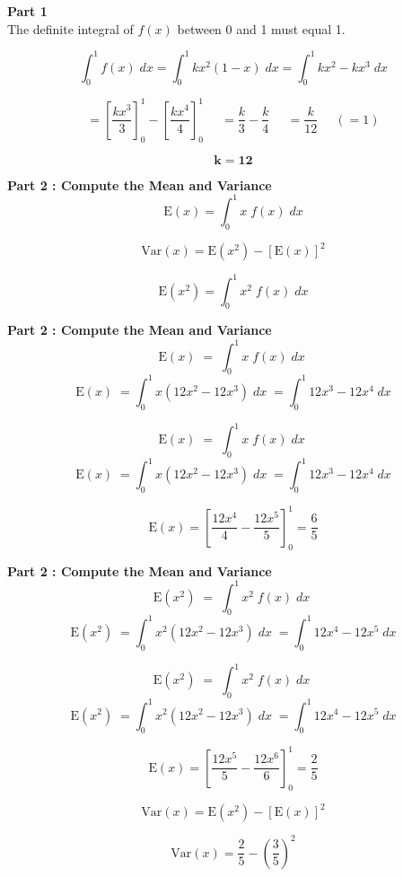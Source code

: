 			
			
			\textbf{Part 1}\\
			The definite integral of $f(x)$ between 0 and 1 must equal 1.
			
			\[ \int^1_0 f(x)\;dx = \int^1_0 kx^2(1-x)\;dx = \int^1_0 kx^2-kx^3\;dx  \]
			
			\[ = \left[\frac{kx^3}{3} \right]^1_0  - \left[\frac{kx^4}{4} \right]^1_0
			\phantom{sce} = \frac{k}{3} - \frac{k}{4} \phantom{sce} = \frac{k}{12} \phantom{sce}(= 1)
			\]
			
			\[ \boldsymbol{k = 12}\]
			
			\textbf{Part 2 :  Compute the Mean and Variance}\\
			\[ \mathrm{E}(x) = \int^1_0 x\; f(x)\;dx  \]
			
			\[ \mathrm{Var}(x) = \mathrm{E}(x^2)  - [\mathrm{E}(x)]^2   \]
			
			\[ \mathrm{E}(x^2) = \int^1_0 x^2\; f(x)\;dx \]
			
			\textbf{Part 2 :  Compute the Mean and Variance}\\
			\[ \mathrm{E}(x) \; = \; \int^1_0 x\; f(x)\;dx \;   \]
			\[ \mathrm{E}(x) \; = \int^1_0 x(12x^2-12x^3)\;dx  \; = \int^1_0 12x^3-12x^4\;dx  \]
			
			
			
			\[ \mathrm{E}(x) \; = \; \int^1_0 x\; f(x)\;dx \;   \]
			\[ \mathrm{E}(x) \; = \int^1_0 x(12x^2-12x^3)\;dx  \; = \int^1_0 12x^3-12x^4\;dx  \]
			
			\[ \mathrm{E}(x)  = \left[\frac{12x^4}{4}-\frac{12x^5}{5} \right]^1_0 = \frac{6}{5} \]
			
			
			\textbf{Part 2 :  Compute the Mean and Variance}\\
			\[ \mathrm{E}(x^2) \; = \; \int^1_0 x^2\; f(x)\;dx \;   \]
			\[ \mathrm{E}(x^2) \; = \int^1_0 x^2(12x^2-12x^3)\;dx  \; = \int^1_0 12x^4-12x^5\;dx  \]
			
			
			\[ \mathrm{E}(x^2) \; = \; \int^1_0 x^2\; f(x)\;dx \;   \]
			\[ \mathrm{E}(x^2) \; = \int^1_0 x^2(12x^2-12x^3)\;dx  \; = \int^1_0 12x^4-12x^5\;dx  \]
			
			\[ \mathrm{E}(x)  = \left[\frac{12x^5}{5}-\frac{12x^6}{6} \right]^1_0 = \frac{2}{5} \]
			
			
			
			\[ \mathrm{Var}(x) = \mathrm{E}(x^2)  - [\mathrm{E}(x)]^2   \]
			
			\[ \mathrm{Var}(x) = \frac{2}{5}  - \left(\frac{3}{5}\right)^2  \]
			
